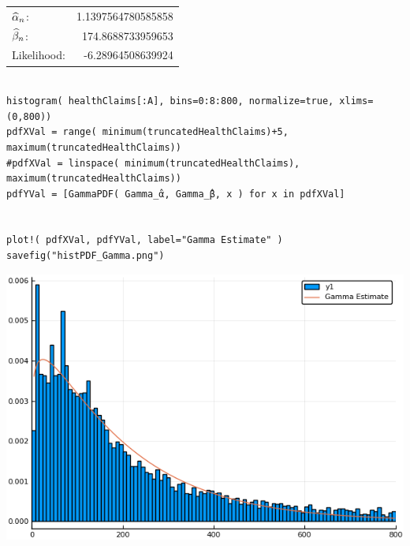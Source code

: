 \documentclass[12pt, letterpaper]{paper}
\begin{document}
\begin{center}
\begin{tabular}{lr}
\(\widehat{ \alpha }_{n}\): & 1.1397564780585858\\
\(\widehat{ \beta }_{n}\): & 174.8688733959653\\
Likelihood: & -6.28964508639924\\
\end{tabular}
\end{center}

\begin{verbatim}

histogram( healthClaims[:A], bins=0:8:800, normalize=true, xlims=(0,800))
pdfXVal = range( minimum(truncatedHealthClaims)+5, maximum(truncatedHealthClaims))
#pdfXVal = linspace( minimum(truncatedHealthClaims), maximum(truncatedHealthClaims))
pdfYVal = [GammaPDF( Gamma_̂α, Gamma_̂β, x ) for x in pdfXVal]


plot!( pdfXVal, pdfYVal, label="Gamma Estimate" )
savefig("histPDF_Gamma.png")
\end{verbatim}

\begin{center}
\includegraphics[width=.9\linewidth]{histPDF_Gamma.png}
\end{center}
\end{document}

